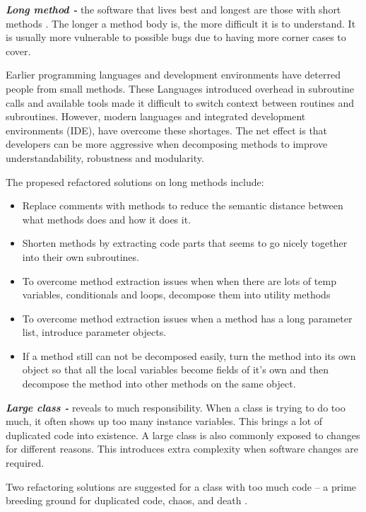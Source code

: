 \textit{\textbf{Long method -}} the software that lives best and longest are those with short methods \cite{fowlerRefactor}. The longer a method body is, the more difficult it is to understand. It is usually more vulnerable to possible bugs due to having more corner cases to cover.

Earlier programming languages and development environments have deterred people from small methods. These Languages introduced overhead in subroutine calls and available tools made it difficult to switch context between routines and subroutines. However, modern languages and integrated development environments (\gls{IDE}), have overcome these shortages. The net effect is that developers can be more aggressive when decomposing methods to improve understandability, robustness and modularity.  

The propesed refactored solutions \cite{fowlerRefactor} on long methods include:

\begin{itemize}
\item Replace comments with methods to reduce the semantic distance between what methods does and how it does it.
\item Shorten methods by extracting code parts that seems to go nicely together into their own subroutines.
\item To overcome method extraction issues when when there are lots of temp variables, conditionals and loops, decompose them into utility methods 
\item To overcome method extraction issues when a method has a long parameter list, introduce parameter objects.  
\item If a method still can not be decomposed easily, turn the method into its own object so that all the local variables become fields of it's own and then decompose the method into other methods on the same object. 
\end{itemize}

\textit{\textbf{Large class -}} reveals to much responsibility. When a class is trying to do too much, it often shows up too many instance variables. This brings a lot of duplicated code into existence. A large class is also commonly exposed to changes for different reasons. This introduces extra complexity when software changes are required.

Two refactoring solutions are suggested for a class with too much code -- a prime breeding ground for duplicated code, chaos, and death \cite{fowlerRefactor}. 

